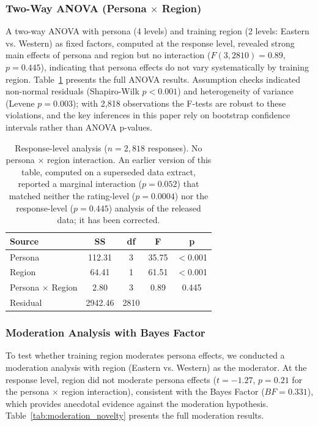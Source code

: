 \documentclass{article}
\begin{document}
\subsubsection{Two-Way ANOVA (Persona $\times$ Region)}

A two-way ANOVA with persona (4 levels) and training region (2 levels: Eastern vs. Western) as fixed factors, computed at the response level, revealed strong main effects of persona and region but no interaction ($F(3, 2810) = 0.89$, $p = 0.445$), indicating that persona effects do not vary systematically by training region. Table~\ref{tab:anova_novelty} presents the full ANOVA results. Assumption checks indicated non-normal residuals (Shapiro-Wilk $p < 0.001$) and heterogeneity of variance (Levene $p = 0.003$); with 2,818 observations the F-tests are robust to these violations, and the key inferences in this paper rely on bootstrap confidence intervals rather than ANOVA p-values.

\begin{table}[H]
\centering
\caption{Two-Way ANOVA Results for Novelty (Persona $\times$ Region)}
\label{tab:anova_novelty}
\begin{tabular}{lcccc}
\toprule
Source & SS & df & F & p \\
\midrule
Persona & 112.31 & 3 & 35.75 & $<$0.001 \\
Region & 64.41 & 1 & 61.51 & $<$0.001 \\
Persona $\times$ Region & 2.80 & 3 & 0.89 & 0.445 \\
Residual & 2942.46 & 2810 & & \\
\bottomrule
\end{tabular}
\caption*{\footnotesize Response-level analysis ($n = 2{,}818$ responses). No persona $\times$ region interaction. An earlier version of this table, computed on a superseded data extract, reported a marginal interaction ($p = 0.052$) that matched neither the rating-level ($p = 0.0004$) nor the response-level ($p = 0.445$) analysis of the released data; it has been corrected.}
\end{table}

\subsubsection{Moderation Analysis with Bayes Factor}

To test whether training region moderates persona effects, we conducted a moderation analysis with region (Eastern vs. Western) as the moderator. At the response level, region did not moderate persona effects ($t = -1.27$, $p = 0.21$ for the persona $\times$ region interaction), consistent with the Bayes Factor ($BF = 0.331$), which provides anecdotal evidence against the moderation hypothesis. Table~\ref{tab:moderation_novelty} presents the full moderation results.
\end{document}
